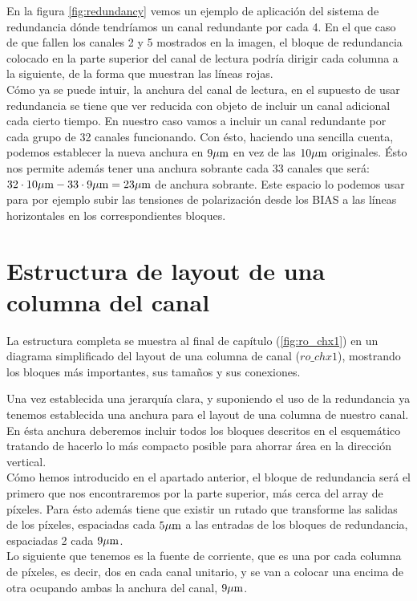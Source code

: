 En la figura \ref{fig:redundancy} vemos un ejemplo de aplicación del sistema de
redundancia dónde tendríamos un canal redundante por cada 4. En el que caso de que
fallen los canales 2 y 5 mostrados en la imagen, el bloque de redundancia colocado
en la parte superior del canal de lectura podría dirigir cada columna a la siguiente,
de la forma que muestran las líneas rojas.\\

Cómo ya se puede intuir, la anchura del canal de lectura, en el supuesto de usar
redundancia se tiene que ver reducida con objeto de incluir un canal adicional
cada cierto tiempo. En nuestro caso vamos a incluir un canal redundante por cada
grupo de 32 canales funcionando. Con ésto, haciendo una sencilla cuenta, podemos
establecer la nueva anchura en $9\mu\text{m}$ en vez de las $10\mu\text{m}$ originales. Ésto nos
permite además tener una anchura sobrante cada 33 canales que será:
$32\cdot 10\mu\text{m} - 33\cdot 9\mu\text{m} = 23\mu\text{m}$ de anchura sobrante. Este espacio lo
podemos usar para por ejemplo subir las tensiones de polarización desde los BIAS
a las líneas horizontales en los correspondientes bloques.\\

\section{Estructura de layout de una columna del canal}

La estructura completa se muestra al final de capítulo (\ref{fig:ro_chx1}) en un diagrama
simplificado del layout de una columna de canal ($ro\_chx1$), mostrando los bloques más
importantes, sus tamaños y sus conexiones.

Una vez establecida una jerarquía clara, y suponiendo el uso de la redundancia ya
tenemos establecida una anchura para el layout de una columna de nuestro canal.
En ésta anchura deberemos incluir todos los bloques descritos en el esquemático
tratando de hacerlo lo más compacto posible para ahorrar área en la dirección vertical.\\

Cómo hemos introducido en el apartado anterior, el bloque de redundancia será
el primero que nos encontraremos por la parte superior, más cerca del array de
píxeles. Para ésto además tiene que existir un rutado que transforme las salidas
de los píxeles, espaciadas cada $5\mu\text{m}$ a las entradas de los bloques de redundancia,
espaciadas 2 cada $9\mu\text{m}$.\\

Lo siguiente que tenemos es la fuente de corriente, que es una por cada columna
de píxeles, es decir, dos en cada canal unitario, y se van a colocar una encima
de otra ocupando ambas la anchura del canal, $9\mu\text{m}$.\\


